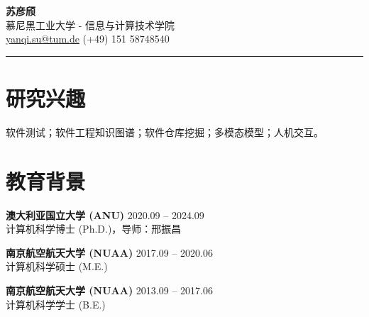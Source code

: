 \documentclass[11pt,a4paper]{ctexart}
\begin{document}
\begin{center}
  {\LARGE \textbf{苏彦颀}} \\
  慕尼黑工业大学 - 信息与计算技术学院 \\
  \href{mailto:yanqi.su@tum.de}{yanqi.su@tum.de} \quad (+49) 151 58748540
\end{center}
\vspace{0.5em}
\hrule
\vspace{1em}


\section*{研究兴趣}
软件测试；软件工程知识图谱；软件仓库挖掘；多模态模型；人机交互。

\section*{教育背景}
\textbf{澳大利亚国立大学 (ANU)} \hfill 2020.09 -- 2024.09\\
计算机科学博士 (Ph.D.)，导师：邢振昌

\textbf{南京航空航天大学 (NUAA)} \hfill 2017.09 -- 2020.06\\
计算机科学硕士 (M.E.)

\textbf{南京航空航天大学 (NUAA)} \hfill 2013.09 -- 2017.06\\
计算机科学学士 (B.E.)
\end{document}
